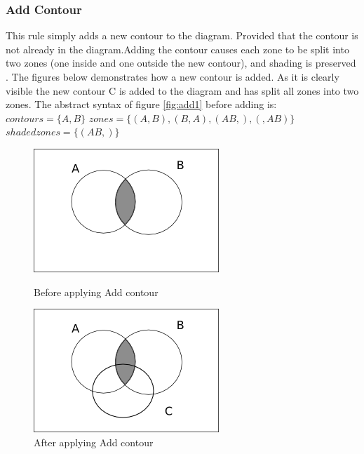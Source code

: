 \documentclass[a4paper]{article}
\begin{document}
\subsubsection{Add Contour}
This rule simply adds a new contour to the diagram. Provided that the contour is not already in the diagram.Adding the contour causes each zone to be split into two zones (one inside and one outside the new contour), and shading is preserved \cite{Fish_2007}.
The figures below demonstrates how a new contour is added.
As it is clearly visible the new contour C is added to the diagram and has split all zones into two zones. The abstract syntax of figure \ref{fig:add1} before adding is:\newline
$contours =  \lbrace A, B \rbrace $ \newline
$zones = \lbrace (A , B) , (B , A), (AB , ) , ( , AB) \rbrace  $ \newline 
$shaded zones = \lbrace (AB , ) \rbrace  $ \newline

\begin{figure}[h]
\begin{minipage}[h]{0.5\linewidth}
\centering
\includegraphics[scale=0.5]{images/diag3add1.png}
\caption{Before applying Add contour}
\label{fig:add1}
\end{minipage}
\hspace{0.5cm}
\begin{minipage}[h]{0.5\linewidth}
\centering
\includegraphics[scale=0.5]{images/diag3add2.png}
\caption{After applying Add contour}
\label{fig:add2}
\end{minipage}
\end{figure}
\end{document}
